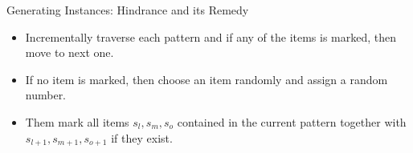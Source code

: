 \documentclass[xcolor=table]{beamer} %
\theoremstyle{definition}
\theoremstyle{plain}
\theoremstyle{remark}
\renewcommand{\b}[1]{\textcolor{dblue}{#1}}
\begin{document}
\begin{frame}{Generating Instances: Hindrance and its Remedy}
\begin{itemize}
\begin{itemize}
                    \item<4-> Incrementally traverse each pattern and if any of the items is marked, then move to next one.
                    
                    \item<5-> If no item is marked, then choose an item randomly and assign a random number.
                    
                    \item<6-> Them mark all items $s_l, s_m, s_o$ contained in the current pattern together with $s_{l+1}, s_{m+1}, s_{o+1}$ if they exist.
                \end{itemize}
        \end{itemize}
    
        
        
    
\end{frame}
\end{document}
